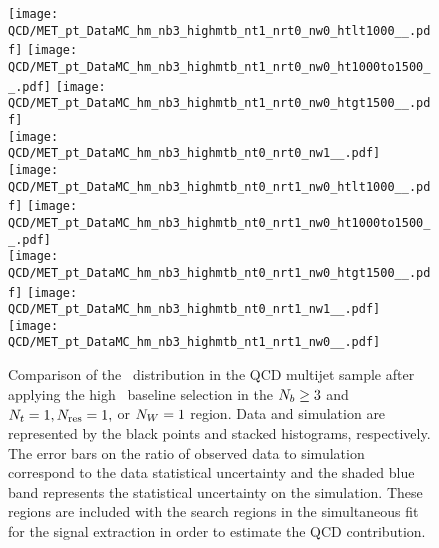\begin{figure}[!h]
	\begin{center}
  \texttt{[image: QCD/MET\_pt\_DataMC\_hm\_nb3\_highmtb\_nt1\_nrt0\_nw0\_htlt1000\_\_.pdf]}
  \texttt{[image: QCD/MET\_pt\_DataMC\_hm\_nb3\_highmtb\_nt1\_nrt0\_nw0\_ht1000to1500\_\_.pdf]} 
  \texttt{[image: QCD/MET\_pt\_DataMC\_hm\_nb3\_highmtb\_nt1\_nrt0\_nw0\_htgt1500\_\_.pdf]} \\
  \texttt{[image: QCD/MET\_pt\_DataMC\_hm\_nb3\_highmtb\_nt0\_nrt0\_nw1\_\_.pdf]} 
  \texttt{[image: QCD/MET\_pt\_DataMC\_hm\_nb3\_highmtb\_nt0\_nrt1\_nw0\_htlt1000\_\_.pdf]} 
  \texttt{[image: QCD/MET\_pt\_DataMC\_hm\_nb3\_highmtb\_nt0\_nrt1\_nw0\_ht1000to1500\_\_.pdf]}  \\
  \texttt{[image: QCD/MET\_pt\_DataMC\_hm\_nb3\_highmtb\_nt0\_nrt1\_nw0\_htgt1500\_\_.pdf]} 
  \texttt{[image: QCD/MET\_pt\_DataMC\_hm\_nb3\_highmtb\_nt0\_nrt1\_nw1\_\_.pdf]} 
  \texttt{[image: QCD/MET\_pt\_DataMC\_hm\_nb3\_highmtb\_nt1\_nrt1\_nw0\_\_.pdf]} \\
	\end{center}
	\caption[QCD Multijet HM Control Region $\nb\geq3$ with 1 Heavy Object]{Comparison of the \met~distribution in the QCD multijet sample after applying the high \dm~baseline selection in the $\nb\geq3$ and $N_{t}=1, N_{\text{res}}=1,$ or $N_{W}=1$ region. Data and simulation are represented by the black points and stacked histograms, respectively. The error bars on the ratio of observed data to simulation correspond to the data statistical uncertainty and the shaded blue band represents the statistical uncertainty on the simulation. These regions are included with the search regions in the simultaneous fit for the signal extraction in order to estimate the QCD contribution.
	 }
	\label{fig:qcd-cr-datavsmc-hm-nb3-1}
\end{figure}
